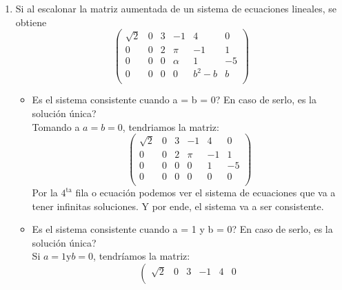 \documentclass{article}
\begin{document}
\begin{enumerate}
    \item Si al escalonar la matriz aumentada de un sistema de ecuaciones lineales, se obtiene
        \[
            \left(
            \begin{array}{ccccc|c}
                \sqrt{2}    & 0        & 3        & -1       & 4        & 0 \\
                0           & 0        & 2        & \pi      & -1       & 1 \\
                0           & 0        & 0        & \alpha   & 1        & -5 \\
                0           & 0        & 0        & 0        & b^2 - b  & b \\
            \end{array}
            \right)
        \]
        \begin{itemize}
            \item Es el sistema consistente cuando a = b = 0? En caso de serlo, es la solución única? \\
                Tomando a \(a = b = 0\), tendriamos la matriz:
                \[
                    \left(
                    \begin{array}{ccccc|c}
                        \sqrt{2}    & 0        & 3        & -1       & 4        & 0 \\
                        0           & 0        & 2        & \pi      & -1       & 1 \\
                        0           & 0        & 0        & 0        & 1        & -5 \\
                        0           & 0        & 0        & 0        & 0        & 0 \\
                    \end{array}
                    \right)
                \]
                Por la \(4^{\text{ta}}\) fila o ecuación podemos ver el sistema de ecuaciones que va a tener infinitas soluciones. 
                Y por ende, el sistema va a ser consistente.
            \item Es el sistema consistente cuando a = 1 y b = 0? En caso de serlo, es la solución única? \\
                Si \(a = 1 \text{y} b = 0\), tendríamos la matriz:
                \[
                    \left(
                    \begin{array}{ccccc|c}
                        \sqrt{2}    & 0        & 3        & -1       & 4        & 0 \\

\end{array}\]
\end{itemize}
\end{enumerate}
\end{document}
